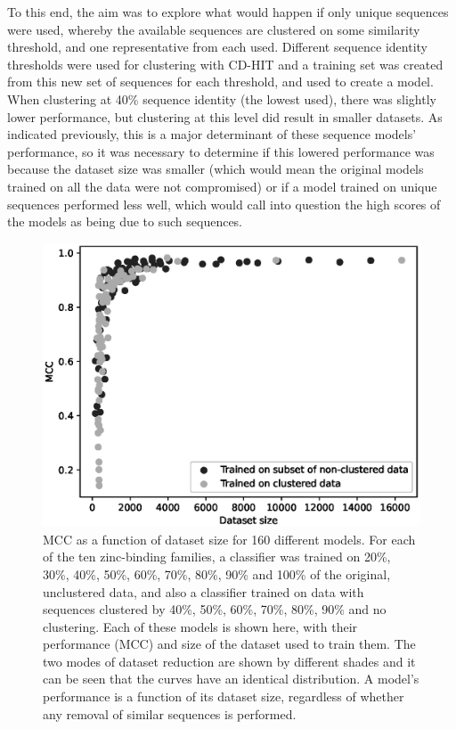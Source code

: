 To this end, the aim was to explore what would happen if only unique sequences were used, whereby the available sequences are clustered on some similarity threshold, and one representative from each used. Different sequence identity thresholds were used for clustering with CD-HIT and a training set was created from this new set of sequences for each threshold, and used to create a model. When clustering at 40\% sequence identity (the lowest used), there was slightly lower performance, but clustering at this level did result in smaller datasets. As indicated previously, this is a major determinant of these sequence models' performance, so it was necessary to determine if this lowered performance was because the dataset size was smaller (which would mean the original models trained on all the data were not compromised) or if a model trained on unique sequences performed less well, which would call into question the high scores of the models as being due to such sequences.

\begin{figure}
\centering
\includegraphics[width=1.0\textwidth]{Figures/clustering.eps}
\caption[MCC as a function of dataset size for 160 different models.]{\label{fig:clustering} MCC as a function of dataset size for
  160 different models.
  For each of the ten zinc-binding families, a
  classifier was trained on 20\%, 30\%, 40\%, 50\%, 60\%, 70\%, 80\%, 90\% and
  100\% of the original, unclustered data, and also a classifier
  trained on data with sequences clustered by 40\%, 50\%, 60\%, 70\%,
  80\%, 90\% and no clustering. Each of these models is shown here,
  with their performance (MCC) and size of the dataset used to train
  them. The two modes of dataset reduction are shown by different
  shades and it can be seen that the curves have an identical distribution. A
  model's performance is a function of its dataset size, regardless of
  whether any removal of similar sequences is performed.}
\end{figure}

